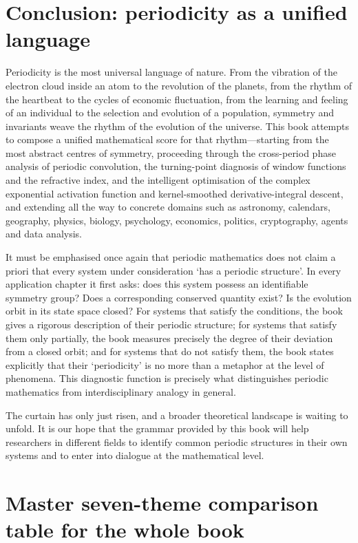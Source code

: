 \section{Conclusion: periodicity as a unified language}

Periodicity is the most universal language of nature. From the vibration of the electron cloud inside an atom to the revolution of the planets, from the rhythm of the heartbeat to the cycles of economic fluctuation, from the learning and feeling of an individual to the selection and evolution of a population, symmetry and invariants weave the rhythm of the evolution of the universe. This book attempts to compose a unified mathematical score for that rhythm---starting from the most abstract centres of symmetry, proceeding through the cross-period phase analysis of periodic convolution, the turning-point diagnosis of window functions and the refractive index, and the intelligent optimisation of the complex exponential activation function and kernel-smoothed derivative-integral descent, and extending all the way to concrete domains such as astronomy, calendars, geography, physics, biology, psychology, economics, politics, cryptography, agents and data analysis.

It must be emphasised once again that periodic mathematics does not claim a priori that every system under consideration `has a periodic structure'. In every application chapter it first asks: does this system possess an identifiable symmetry group? Does a corresponding conserved quantity exist? Is the evolution orbit in its state space closed? For systems that satisfy the conditions, the book gives a rigorous description of their periodic structure; for systems that satisfy them only partially, the book measures precisely the degree of their deviation from a closed orbit; and for systems that do not satisfy them, the book states explicitly that their `periodicity' is no more than a metaphor at the level of phenomena. This diagnostic function is precisely what distinguishes periodic mathematics from interdisciplinary analogy in general.

The curtain has only just risen, and a broader theoretical landscape is waiting to unfold. It is our hope that the grammar provided by this book will help researchers in different fields to identify common periodic structures in their own systems and to enter into dialogue at the mathematical level.

\section*{Master seven-theme comparison table for the whole book}

